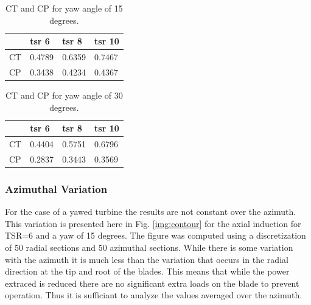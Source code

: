 \begin{table}[]
\caption{CT and CP for yaw angle of 15 degrees.}
\begin{tabular}{|l|l|l|l|}
\hline
   & tsr 6 & tsr 8 & tsr 10  \\ \hline
CT &   0.4789    &  0.6359     &   0.7467     \\ \hline
CP &   0.3438    &  0.4234     &   0.4367     \\ \hline
\end{tabular}
\label{tbl:coef-15}
\end{table}


\begin{table}[]
\caption{CT and CP for yaw angle of 30 degrees.}
\begin{tabular}{|l|l|l|l|}
\hline
   & tsr 6 & tsr 8 & tsr 10  \\ \hline
CT &   0.4404    &  0.5751     &   0.6796     \\ \hline
CP &   0.2837    &  0.3443     &   0.3569     \\ \hline
\end{tabular}
\label{tbl:coef-30}
\end{table}

\subsubsection{\textbf{Azimuthal Variation} }
For the case of a yawed turbine the results are not constant over the azimuth. This variation is presented here in Fig. \ref{img:contour} for the axial induction for TSR=6 and a yaw of 15 degrees. The figure was computed using a discretization of 50 radial sections and 50 azimuthal sections. While there is some variation with the azimuth it is much less than the variation that occurs in the radial direction at the tip and root of the blades. This means that while the power extraced is reduced there are no significant extra loads on the blade to prevent operation. Thus it is sufficiant to analyze the values averaged over the azimuth.

